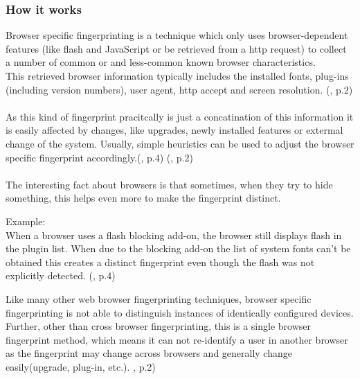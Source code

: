 \subsubsection{How it works}
Browser specific fingerprinting is a technique which only uses browser-dependent features (like flash and JavaScript or be retrieved from a http request) to collect a number of common or and less-common known browser characteristics.\\

This retrieved browser information typically includes the installed fonts, plug-ins (including version numbers), user agent, http accept and screen resolution. (\textcite{upi15}, p.2)\\\\
As this kind of fingerprint pracitcally is just a concatination of this information it is easily affected by changes, like upgrades, newly installed features or extermal change of the system.
Usually, simple heuristics can be used to adjust the browser specific fingerprint accordingly.(\textcite{eckersley10}, p.4) (\textcite{upi15}, p.2)\\\\
The interesting fact about browsers is that sometimes, when they try to hide something, this helps even more to make the fingerprint distinct.

\begin{tcolorbox}
	Example: \\
	When a browser uses a flash blocking add-on, the browser still displays flash in the plugin list. When due to the blocking add-on the list of system fonts can't be obtained this creates a distinct fingerprint even though the flash was not explicitly detected. (\textcite{eckersley10}, p.4)
\end{tcolorbox}

Like many other web browser fingerprinting techniques, browser specific fingerprinting is not able to distinguish instances of identically configured devices. Further, other than cross browser fingerprinting, this is a single browser fingerprint method, which means it can not re-identify a user in another browser as the fingerprint may change across browsers and generally change easily(upgrade, plug-in, etc.). \textcite{upi15}, p.2)

